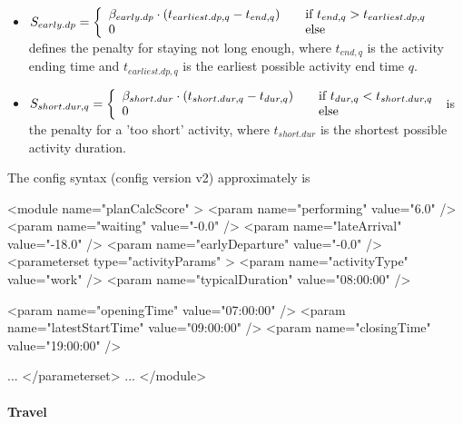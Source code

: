 \begin{itemize}
\medskip

\item $S_{early.dp} = \left\{
  \begin{array}{l l}
    \beta_{early.dp} \cdot (t_{earliest.dp, q} - t_{end,q}) & \quad \text{if $t_{end,q} > t_{earliest.dp,q}$}\\
    0 & \quad \text{else}
  \end{array} \right.$
%
defines the penalty for staying not long enough, where $t_{end,q}$ is the activity ending time and $t_{earliest.dp,q}$ is the earliest possible activity end time $q$.

\medskip

\item $ S_{short.dur, q} = \left\{
  \begin{array}{l l}
    \beta_{short.dur} \cdot (t_{short.dur, q} - t_{dur,q}) & \quad \text{if $t_{dur,q} < t_{short.dur,q}$}\\
    0 & \quad \text{else}
  \end{array} \right.$
%  
  is the penalty for a 'too short' activity, where $t_{short.dur}$ is the shortest possible activity duration.
\end{itemize}

The config syntax (config version v2) approximately is
\begin{xml}
<module name="planCalcScore" >
   <param name="performing" value="6.0" />
   <param name="waiting" value="-0.0" />
   <param name="lateArrival" value="-18.0" />
   <param name="earlyDeparture" value="-0.0" />
   <parameterset type="activityParams" >
   <param name="activityType" value="work" />
   <param name="typicalDuration" value="08:00:00" />

   <param name="openingTime" value="07:00:00" />
   <param name="latestStartTime" value="09:00:00" />
   <param name="closingTime" value="19:00:00" />

   ...   
   </parameterset>
   ...   
</module>
\end{xml}


\paragraph{Travel} 

